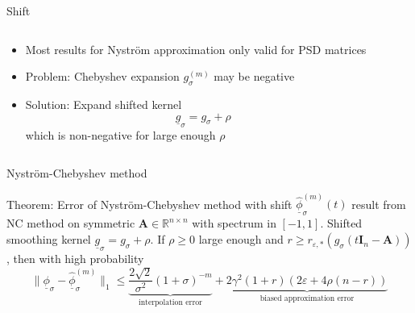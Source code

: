 \documentclass[aspectratio=169, leqno, 12pt]{beamer}
\newcommand{\mtx}[1]{\boldsymbol{#1}}
\begin{document}
\begin{frame}{Shift}
    \begin{columns}
        \begin{column}{0.55\textwidth}
            \begin{itemize}
                \item Most results for Nystr\"om approximation only valid for PSD matrices
                \item Problem: Chebyshev expansion $g_{\sigma}^{(m)}$ may be negative
                \item Solution: Expand shifted kernel
                    \begin{equation}
                        \underline{g}_{\sigma} = g_{\sigma} + \rho
                    \end{equation}
                    which is non-negative for large enough $\rho$
            \end{itemize}
        \end{column}
        \begin{column}{0.45\textwidth}
            \scalebox{0.65}{}
        \end{column}
    \end{columns}   
\end{frame}

\begin{frame}{Nystr\"om-Chebyshev method}
    \begin{block}{Theorem: Error of Nystr\"om-Chebyshev method with shift}
        $\underline{\widehat{\phi}}_{\sigma}^{(m)}(t)$ result from \gls{NC} method
        on symmetric $\mtx{A} \in \mathbb{R}^{n \times n}$ with spectrum in $[-1, 1]$.
        Shifted smoothing kernel $\underline{g}_{\sigma}=g_{\sigma} + \rho$.
        If $\rho \geq 0$ large enough and $r \geq r_{\varepsilon, \ast}(g_{\sigma}(t\mtx{I}_n - \mtx{A}))$,
        then with high probability
        \begin{equation}
            \lVert \underline{\phi}_{\sigma} - \widehat{\underline{\phi}}_{\sigma}^{(m)} \rVert _1
            \leq \underbrace{\frac{2\sqrt{2}}{\sigma^2} (1 + \sigma)^{-m}}_{\text{interpolation error}}
             + \underbrace{2 \gamma^2(1 + r) (2 \varepsilon + 4 \rho (n-r))}_{\text{biased approximation error}}
        \end{equation}
    \end{block}
\end{frame}
\end{document}
